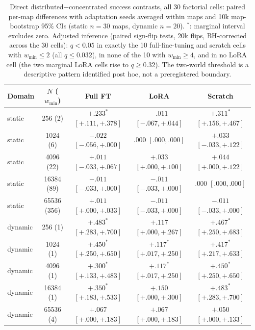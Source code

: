 \documentclass[letterpaper]{article} %
\begin{document}
\begin{table}[t]
\centering
\small
\setlength{\tabcolsep}{3.4pt}
\begin{tabular}{@{}lc ccc@{}}
\toprule
Domain & $N$ ($w_{\min}$) & Full FT & LoRA & Scratch \\
\midrule
static & 256 (2) & $+.233^{*}$ $[+.111,+.378]$ & $-.011$ $[-.067,+.044]$ & $+.311^{*}$ $[+.156,+.467]$ \\
static & 1024 (6) & $-.022$ $[-.056,+.000]$ & $.000$ $[.000,.000]$ & $+.033$ $[-.033,+.122]$ \\
static & 4096 (22) & $+.011$ $[-.033,+.067]$ & $+.033$ $[+.000,+.100]$ & $+.044$ $[+.000,+.122]$ \\
static & 16384 (89) & $-.011$ $[-.033,+.000]$ & $-.011$ $[-.033,+.000]$ & $.000$ $[.000,.000]$ \\
static & 65536 (356) & $+.011$ $[+.000,+.033]$ & $-.011$ $[-.033,+.000]$ & $-.011$ $[-.033,+.000]$ \\
dynamic & 256 (1) & $+.483^{*}$ $[+.283,+.700]$ & $+.117$ $[+.000,+.267]$ & $+.467^{*}$ $[+.250,+.683]$ \\
dynamic & 1024 (1) & $+.450^{*}$ $[+.250,+.650]$ & $+.117^{*}$ $[+.017,+.250]$ & $+.417^{*}$ $[+.217,+.633]$ \\
dynamic & 4096 (1) & $+.300^{*}$ $[+.133,+.483]$ & $+.117^{*}$ $[+.017,+.250]$ & $+.450^{*}$ $[+.250,+.650]$ \\
dynamic & 16384 (1) & $+.350^{*}$ $[+.183,+.533]$ & $+.150$ $[+.000,+.300]$ & $+.483^{*}$ $[+.283,+.700]$ \\
dynamic & 65536 (4) & $+.067$ $[+.000,+.183]$ & $+.067$ $[+.000,+.183]$ & $+.050$ $[+.000,+.133]$ \\
\bottomrule
\end{tabular}
\caption{Direct distributed$-$concentrated success contrasts, all 30 factorial cells: paired per-map differences with adaptation seeds averaged within maps and 10k map-bootstrap 95\% CIs (static $n{=}30$ maps, dynamic $n{=}20$). $^{*}$: marginal interval excludes zero. Adjusted inference (paired sign-flip tests, 20k flips, BH-corrected across the 30 cells): $q{<}0.05$ in exactly the 10 full-fine-tuning and scratch cells with $w_{\min} \leq 2$ (all $q \leq 0.032$), in none of the 10 with $w_{\min} \geq 4$, and in no LoRA cell (the two marginal LoRA cells rise to $q \geq 0.32$). The two-world threshold is a descriptive pattern identified post hoc, not a preregistered boundary.}
\label{tab:c14cov}
\end{table}
\end{document}
